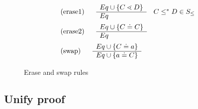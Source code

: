\documentclass[runningheads]{llncs}
\begin{document}
\begin{figure}
\begin{align*}
&\begin{tabular}[t]{ll}
      (erase1)  & $ 
      \begin{array}[c]{ll}
        \begin{array}[c]{l}
          Eq \cup \set{C \lessdot D}\\
          \hline
          Eq
        \end{array}
        & C \leq^* D \in S_\leq
      \end{array}$\\
          \end{tabular}\\
&\begin{tabular}[t]{ll}
      (erase2)  & $ 
      \begin{array}[c]{ll}
        \begin{array}[c]{l}
          Eq \cup \set{C \doteq C}\\
          \hline
          Eq
        \end{array}
      \end{array}$\\
          \end{tabular}\\
    &      \begin{tabular}[t]{ll}
       (swap) & $
            \begin{array}[c]{ll}
              \begin{array}[c]{l}
                Eq \cup \set{C \doteq a}\\
                \hline
                Eq \cup \set{a \doteq C}
              \end{array}
            \end{array}$
          \end{tabular}
\end{align*}
\caption{Erase and swap rules}\label{fig:fgjerase-rules}
\end{figure}

\subsection{Unify proof}
\end{document}
